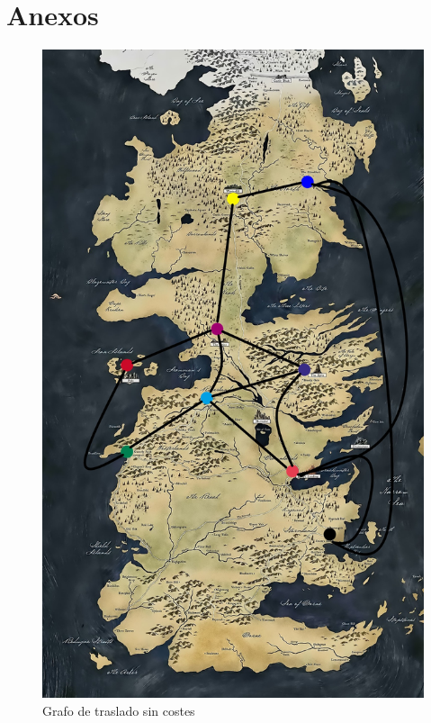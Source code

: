 \documentclass[a4paper,10pt,twocolumn]{article}
\theoremstyle{theorem}
\theoremstyle{definition}
\theoremstyle{remark}
\begin{document}
\newpage

\section{Anexos}

\begin{figure}[h!]%
	\begin{center}
		\begin{center}
			\includegraphics[scale=.2]{images/Poniente.jpg}
		\end{center}
	\caption{Grafo de traslado sin costes}\label{fig:ejer_6_map}
	\end{center}
\end{figure}
\end{document}
